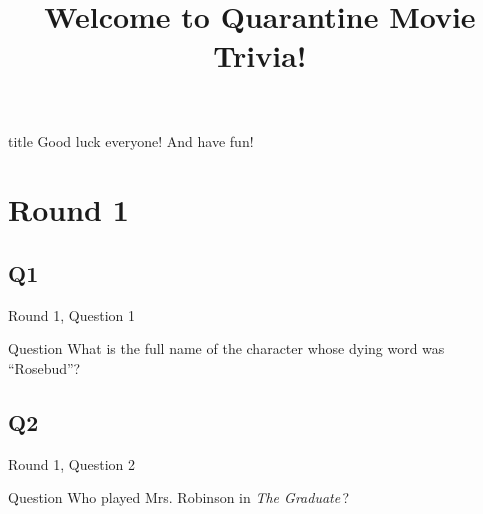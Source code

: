 \documentclass[11pt]{beamer}
\begin{document}
\title{Welcome to Quarantine Movie Trivia!\vspace{-0.5in}}
\date{}

\begin{frame}
\titlepage{}
\end{frame}

\begingroup{}
\begin{frame}
\vfill{}
\begin{beamercolorbox}[sep=8pt,center,shadow=true,rounded=true]{title}
Good luck everyone! And have fun!
\end{beamercolorbox}
\vfill{}
\end{frame}
\endgroup{}
    

\section{Round 1}
    

\subsection*{Q1}
\begin{frame}[t]{Round 1, Question 1}
\vspace{2em}
\begin{block}{Question}
What is the full name of the character whose dying word was ``Rosebud''?
\end{block}
\end{frame}
    

\subsection*{Q2}
\begin{frame}[t]{Round 1, Question 2}
\vspace{2em}
\begin{block}{Question}
Who played Mrs. Robinson in \emph{The Graduate}\,?
\end{block}
\end{frame}
    
\end{document}
